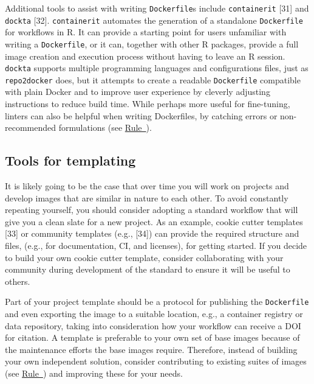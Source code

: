 \documentclass[10pt,letterpaper]{article}
\begin{document}
Additional tools to assist with writing \texttt{Dockerfile}s include
\texttt{containerit} {[}31{]} and \texttt{dockta} {[}32{]}.
\texttt{containerit} automates the generation of a standalone
\texttt{Dockerfile} for workflows in R. It can provide a starting point
for users unfamiliar with writing a \texttt{Dockerfile}, or it can,
together with other R packages, provide a full image creation and
execution process without having to leave an R session. \texttt{dockta}
supports multiple programming languages and configurations files, just
as \texttt{repo2docker} does, but it attempts to create a readable
\texttt{Dockerfile} compatible with plain Docker and to improve user
experience by cleverly adjusting instructions to reduce build time.
While perhaps more useful for fine-tuning, linters can also be helpful
when writing Dockerfiles, by catching errors or non-recommended
formulations (see \hyperref[{rule:usage}]{Rule~}).

\hypertarget{tools-for-templating}{%
\subsection{Tools for templating}\label{tools-for-templating}}

It is likely going to be the case that over time you will work on
projects and develop images that are similar in nature to each other. To
avoid constantly repeating yourself, you should consider adopting a
standard workflow that will give you a clean slate for a new project. As
an example, cookie cutter templates {[}33{]} or community templates
(e.g., {[}34{]}) can provide the required structure and files, (e.g.,
for documentation, CI, and licenses), for getting started. If you decide
to build your own cookie cutter template, consider collaborating with
your community during development of the standard to ensure it will be
useful to others.

Part of your project template should be a protocol for publishing the
\texttt{Dockerfile} and even exporting the image to a suitable location,
e.g., a container registry or data repository, taking into consideration
how your workflow can receive a DOI for citation. A template is
preferable to your own set of base images because of the maintenance
efforts the base images require. Therefore, instead of building your own
independent solution, consider contributing to existing suites of images
(see \hyperref[{rule:base}]{Rule~}) and improving
these for your needs.
\end{document}
